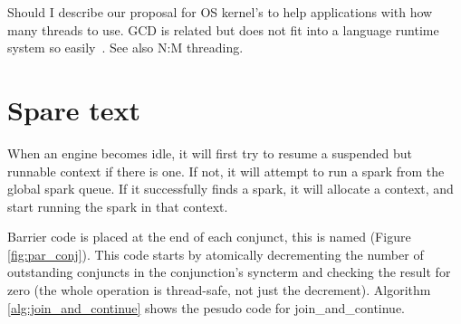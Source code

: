 Should I describe our proposal for OS kernel's to help
applications with how many threads to use.
GCD is related but does not fit into a language runtime system so
easily~\cite{apple_gcd}.
See also N:M threading.

\section{Spare text}


%
%

When an engine becomes idle, it will first try
to resume a suspended but runnable context if there is one.
If not, it will attempt to run a spark from the global spark queue.
If it successfully finds a spark, it will allocate a context,
and start running the spark in that context.


Barrier code is placed at the end of each conjunct,
this is named  (Figure \ref{fig:par_conj}).
This code starts by atomically decrementing the number of outstanding
conjuncts in the conjunction's syncterm and checking the result for zero
(the whole operation is thread-safe, not just the decrement).
Algorithm \ref{alg:join_and_continue} shows the pesudo code for
join\_and\_continue.

